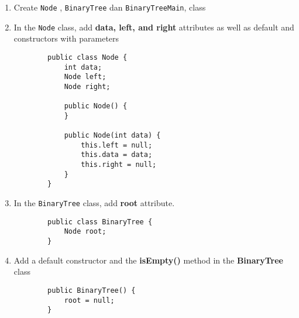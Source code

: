 \documentclass[12pt,titlepage]{article}
\begin{document}
\begin{enumerate}
    \item Create \texttt{Node} , \texttt{BinaryTree} dan \texttt{BinaryTreeMain}, class
    \item In the \texttt{Node} class, add \textbf{data, left, and right} attributes as well as default and constructors with parameters
    \begin{verbatim}
        public class Node {
            int data;
            Node left;
            Node right;

            public Node() {
            }

            public Node(int data) {
                this.left = null;
                this.data = data;
                this.right = null;
            }
        }
    \end{verbatim}
    \item In the \texttt{BinaryTree} class, add \textbf{root} attribute.
    \begin{verbatim}
        public class BinaryTree {
            Node root;
        }
    \end{verbatim}
    \item Add a default constructor and the \textbf{isEmpty()} method in the \textbf{BinaryTree} class
    \begin{verbatim}
        public BinaryTree() {
            root = null;
        }


\end{verbatim}
\end{enumerate}
\end{document}
